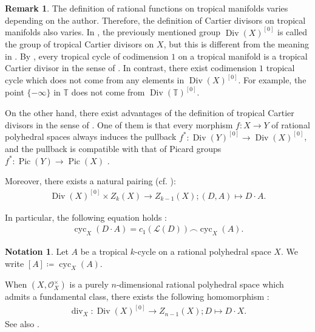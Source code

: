 \documentclass[a4paper,dvipdfmx,reqno,12pt]{amsart}
\theoremstyle{definition}
\newtheorem{notation}[theorem]{Notation}
\newtheorem{remark}[theorem]{Remark}
\newcommand{\deq}{\coloneqq}
\newcommand{\opn}[1]{\operatorname{#1}}
\numberwithin{equation}{section}
\begin{document}
\begin{remark}
The definition of rational functions on tropical
manifolds varies depending on the author.
Therefore, the definition of Cartier divisors
on tropical manifolds also varies.
In \cite{MR3894860,MR4637248},
the previously mentioned group
$\opn{Div}(X)^{[0]}$ is called
the group of tropical Cartier divisors on $X$,
but this is different from the meaning
in \cite{demedrano2023chern}.
By \cite[Proposition 3.27]{shaw2015tropical},
every tropical cycle of codimension $1$ on a tropical manifold
is a tropical Cartier divisor in the sense of
\cite{shaw2015tropical,demedrano2023chern}.
In contrast, there exist codimension $1$
tropical cycle which does not come from any
elements in $\opn{Div}(X)^{[0]}$.
For example,
the point $\{-\infty\}$ in $\mathbb{T}$ does not
come from $\opn{Div}(\mathbb{T})^{[0]}$.

On the other hand, there exist advantages of
the definition of tropical Cartier divisors in the
sense of \cite{MR3894860,MR4637248}.
One of them is that 
every morphism $f\colon X\to Y$ of rational polyhedral
spaces always induces the pullback
$f^{*}\colon \opn{Div}(Y)^{[0]} \to \opn{Div}(X)^{[0]}$,
and the pullback is compatible with that of 
Picard groups $f^{*}\colon \opn{Pic}(Y) \to \opn{Pic}(X)$
\cite[Propoisition 3.15]{MR4637248}.
\end{remark}

Moreover,
there exists a natural pairing
\cite[]{MR4637248}
(cf. \cite[Definition 6.5]{MR2591823}):
\begin{align}
\label{equation-divisor-pairing}
\opn{Div}(X)^{[0]}\times Z_{k}(X)\to Z_{k-1}(X);
(D,A) \mapsto D\cdot A.
\end{align}

In particular, the following equation holds
\cite[Proposition 5.12]{MR4637248}:
\begin{align}
\opn{cyc}_X(D\cdot A)=c_1(\mathcal{L}(D))
\frown \opn{cyc}_X(A).
\end{align}

\begin{notation}
Let $A$ be a tropical $k$-cycle on a rational polyhedral space $X$.
We write $[A]\deq \opn{cyc}_X(A)$.
\end{notation}

When $(X,\mathcal{O}_X^{\times})$ is 
a purely $n$-dimensional rational polyhedral space
which admits a fundamental class, there exists 
the following homomorphism 
\cite[Definition 4.14]{MR3894860}:
\begin{align}
\label{equation-divisor-map}
\opn{div}_X\colon
\opn{Div}(X)^{[0]}\to Z_{n-1}(X); D\mapsto D\cdot X.  
\end{align}
See also \cite[Theorem 4.15]{MR3894860}.
\end{document}
